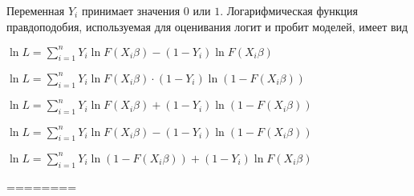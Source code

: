 
\begin{question}
Переменная \(Y_i\) принимает значения \(0\) или \(1\). Логарифмическая
функция правдоподобия, используемая для оценивания логит и пробит
моделей, имеет вид
\begin{answerlist}
  \item \(\ln L = \sum_{i=1}^n Y_i \ln F(X_i \beta) - (1 - Y_i) \ln F(X_i \beta)\)
  \item \(\ln L = \sum_{i=1}^n Y_i \ln F(X_i \beta) \cdot (1 - Y_i) \ln (1 - F(X_i \beta))\)
  \item \(\ln L = \sum_{i=1}^n Y_i \ln F(X_i \beta) + (1 - Y_i) \ln (1 - F(X_i \beta))\)
  \item \(\ln L = \sum_{i=1}^n Y_i \ln F(X_i \beta) - (1 - Y_i) \ln (1 - F(X_i \beta))\)
  \item \(\ln L = \sum_{i=1}^n Y_i \ln (1 - F(X_i \beta)) + (1 - Y_i) \ln F(X_i \beta)\)
\end{answerlist}
\end{question}

\begin{solution}
========
\end{solution}

